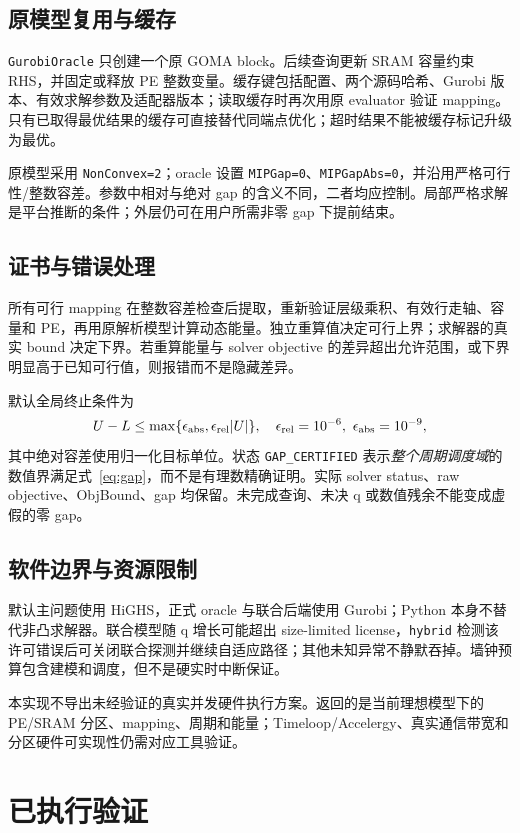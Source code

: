 \documentclass[UTF8,11pt,a4paper,fontset=fandol]{ctexart}
\theoremstyle{remark}\newtheorem{remark}[proposition]{说明}
\numberwithin{equation}{section}
\begin{document}
\subsection{原模型复用与缓存}
\texttt{GurobiOracle} 只创建一个原 GOMA block。后续查询更新 SRAM 容量约束 RHS，并固定或释放 PE 整数变量。缓存键包括配置、两个源码哈希、Gurobi 版本、有效求解参数及适配器版本；读取缓存时再次用原 evaluator 验证 mapping。只有已取得最优结果的缓存可直接替代同端点优化；超时结果不能被缓存标记升级为最优。

原模型采用 \texttt{NonConvex=2}；oracle 设置 \texttt{MIPGap=0}、\texttt{MIPGapAbs=0}，并沿用严格可行性/整数容差。参数中相对与绝对 gap 的含义不同，二者均应控制\cite{gurobi-params}。局部严格求解是平台推断的条件；外层仍可在用户所需非零 gap 下提前结束。

\subsection{证书与错误处理}
所有可行 mapping 在整数容差检查后提取，重新验证层级乘积、有效行走轴、容量和 PE，再用原解析模型计算动态能量。独立重算值决定可行上界；求解器的真实 bound 决定下界。若重算能量与 solver objective 的差异超出允许范围，或下界明显高于已知可行值，则报错而不是隐藏差异。

默认全局终止条件为
\begin{equation}
U-L\le\max\{\epsilon_{\rm abs},\epsilon_{\rm rel}|U|\},
\quad \epsilon_{\rm rel}=10^{-6},\ \epsilon_{\rm abs}=10^{-9},
\label{eq:gap}
\end{equation}
其中绝对容差使用归一化目标单位。状态 \texttt{GAP\_CERTIFIED} 表示\emph{整个周期调度域}的数值界满足式~\eqref{eq:gap}，而不是有理数精确证明。实际 solver status、raw objective、ObjBound、gap 均保留。未完成查询、未决 q 或数值残余不能变成虚假的零 gap。

\subsection{软件边界与资源限制}
默认主问题使用 HiGHS，正式 oracle 与联合后端使用 Gurobi；Python 本身不替代非凸求解器。联合模型随 q 增长可能超出 size-limited license，\texttt{hybrid} 检测该许可错误后可关闭联合探测并继续自适应路径；其他未知异常不静默吞掉。墙钟预算包含建模和调度，但不是硬实时中断保证。

本实现不导出未经验证的真实并发硬件执行方案。返回的是当前理想模型下的 PE/SRAM 分区、mapping、周期和能量；Timeloop/Accelergy、真实通信带宽和分区硬件可实现性仍需对应工具验证。

\section{已执行验证}
\label{sec:validation}
\end{document}
